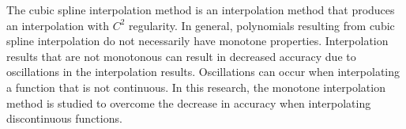 \documentclass{skripsimathugm}
\begin{document}
\begin{abstracteng}
The cubic spline interpolation method is an interpolation method that produces an interpolation with $C^2$ regularity. In general, polynomials resulting from cubic spline interpolation do not necessarily have monotone properties. Interpolation results that are not monotonous can result in decreased accuracy due to oscillations in the interpolation results. Oscillations can occur when interpolating a function that is not continuous. In this research, the monotone interpolation method is studied to overcome the decrease in accuracy when interpolating discontinuous functions.
\end{abstracteng}







\end{document}

